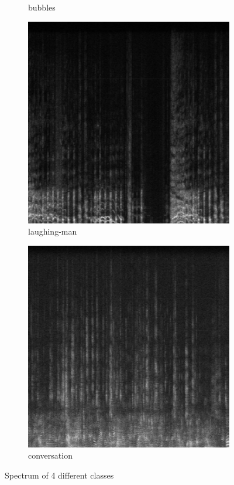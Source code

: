 \documentclass[a4paper,10pt,final]{ThesisStyle}
\begin{document}
\begin{figure}
\begin{subfigure}[b]{0.25\textwidth}
                \caption{bubbles}
        \end{subfigure}%
        \begin{subfigure}[b]{0.25\textwidth}
                \centering
                \includegraphics[width=\textwidth]{images/laughing-man.pdf}
                \caption{laughing-man}
        \end{subfigure}%
        \begin{subfigure}[b]{0.25\textwidth}
                \centering
                \includegraphics[width=\textwidth]{images/conversation.pdf}
                \caption{conversation}
        \end{subfigure}%
        \caption{Spectrum of 4 different classes}
\end{figure}
\end{document}
